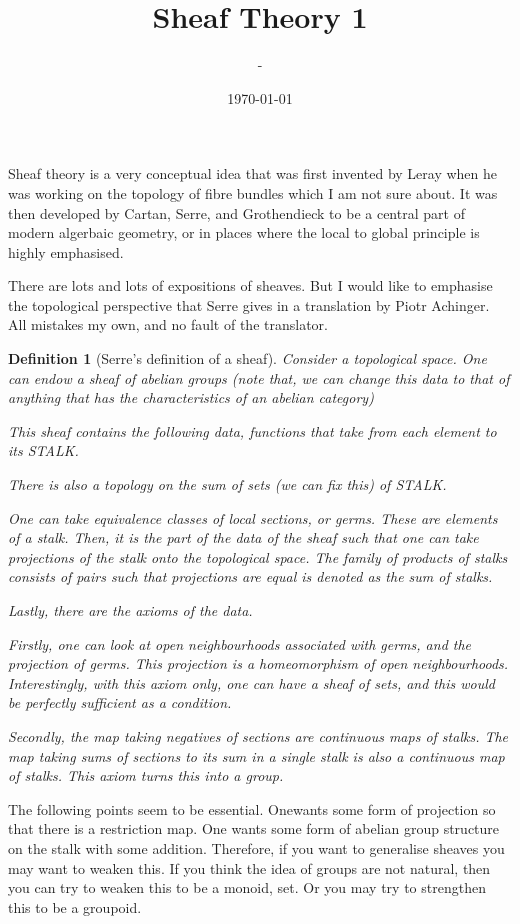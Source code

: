 \documentclass[12pt]{article}
\title{Sheaf Theory 1}
\author{-}
\date{\today}
\newtheorem{definition}{Definition}
\begin{document}
\maketitle

Sheaf theory is a very conceptual idea that was first invented by Leray when he was working on the topology of fibre bundles which I am not sure about. It was then developed by Cartan, Serre, and Grothendieck to be a central part of modern algerbaic geometry, or in places where the local to global principle is highly emphasised.

There are lots and lots of expositions of sheaves. But I would like to emphasise the topological perspective that Serre gives in a translation by Piotr Achinger. All mistakes my own, and no fault of the translator.

\begin{definition}[Serre's definition of a sheaf]
    Consider a topological space. One can endow a sheaf of abelian groups (note that, we can change this data to that of anything that has the characteristics of an abelian category)

    This sheaf contains the following data, functions that take from each element to its STALK.

    There is also a topology on the sum of sets (we can fix this) of STALK.

    One can take equivalence classes of local sections, or germs. These are elements of a stalk. Then, it is the part of the data of the sheaf such that one can take projections of the stalk onto the topological space. The family of products of stalks consists of pairs such that projections are equal is denoted as the sum of stalks.

    Lastly, there are the axioms of the data.
    
    Firstly, one can look at open neighbourhoods associated with germs, and the projection of germs. This projection is a homeomorphism of open neighbourhoods. Interestingly, with this axiom only, one can have a sheaf of sets, and this would be perfectly sufficient as a condition.

    Secondly, the map taking negatives of sections are continuous maps of stalks. The map taking sums of sections to its sum in a single stalk is also a continuous map of stalks. This axiom turns this into a group.
\end{definition}

The following points seem to be essential. Onewants some form of projection so that there is a restriction map. One wants some form of abelian group structure on the stalk with some addition. Therefore, if you want to generalise sheaves you may want to weaken this. If you think the idea of groups are not natural, then you can try to weaken this to be a monoid, set. Or you may try to strengthen this to be a groupoid.
\end{document}
